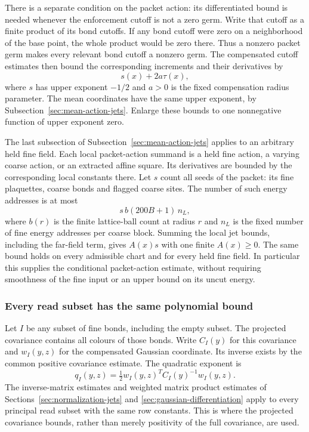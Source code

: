 There is a separate condition on the packet action: its differentiated
bound is needed whenever the enforcement cutoff is not a zero germ.
Write that cutoff as a finite product of its bond cutoffs. If any
bond cutoff were zero on a neighborhood of the base point, the whole
product would be zero there. Thus a nonzero packet germ makes every
relevant bond cutoff a nonzero germ. The compensated cutoff estimates
then bound the corresponding increments and their derivatives by
\[
                    s(x)+2a\tau(x),
\]
where $s$ has upper exponent $-1/2$ and $a>0$ is the fixed
compensation radius parameter. The mean coordinates have the same
upper exponent, by Subsection~\ref{sec:mean-action-jets}. Enlarge these
bounds to one nonnegative function of upper exponent zero.

The last subsection of Subsection~\ref{sec:mean-action-jets} applies to
an arbitrary held fine field. Each local packet-action summand is
a held fine action, a varying coarse action, or an extracted affine
square. Its derivatives are bounded by the corresponding local
constants there. Let $s$ count all seeds of the packet: its fine
plaquettes, coarse bonds and flagged coarse sites. The number of such
energy addresses is at most
\[
                  s\,b(200B+1)\,n_L,
\]
where $b(r)$ is the finite lattice-ball count at radius $r$ and $n_L$
is the fixed number of fine energy addresses per coarse block.
Summing the local jet bounds, including the far-field term, gives
$A(x)s$ with one finite $A(x)\ge0$. The same bound holds on every
admissible chart and for every held fine field. In particular this
supplies the conditional packet-action estimate, without requiring
smoothness of the fine input or an upper bound on its uncut energy.

\subsubsection{Every read subset has the same polynomial bound}
Let $I$ be any subset of fine bonds, including the empty subset.
The projected covariance contains all colours of those bonds.
Write $C_I(y)$ for this covariance and $w_I(y,z)$ for the compensated
Gaussian coordinate. Its inverse exists by the common positive
covariance estimate. The quadratic exponent is
\[
              q_I(y,z)=\tfrac12 w_I(y,z)^T C_I(y)^{-1}w_I(y,z).
\]
The inverse-matrix estimates and weighted matrix product estimates
of Sections~\ref{sec:normalization-jets} and
\ref{sec:gaussian-differentiation} apply to every principal read
subset with the same row constants. This is where the projected
covariance bounds, rather than merely positivity of the full
covariance, are used.

